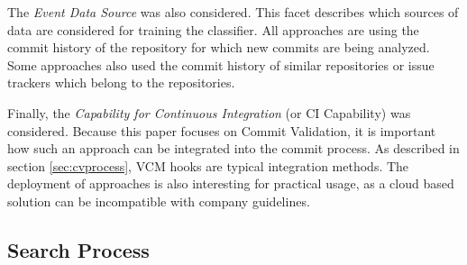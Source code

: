 The \textit{Event Data Source} was also considered. This facet describes which sources of data are considered for training the classifier. All approaches are using the commit history of the repository for which new commits are being analyzed. Some approaches also used the commit history of similar repositories or issue trackers which belong to the repositories.

Finally, the \textit{Capability for Continuous Integration} (or CI Capability) was considered. Because this paper focuses on Commit Validation, it is important how such an approach can be integrated into the commit process. As described in section \ref{sec:cvprocess}, VCM hooks are typical integration methods. The deployment of approaches is also interesting for practical usage, as a cloud based solution can be incompatible with company guidelines.


\subsection{Search Process}
\label{sec:searchprocess}

